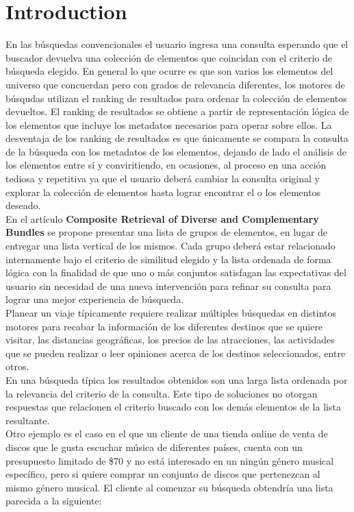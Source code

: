 
\section{Introduction}
En las búsquedas convencionales el usuario ingresa una consulta esperando que el buscador devuelva una colección de elementos que coincidan con el criterio de búsqueda elegido. En general lo que ocurre es que son varios los elementos del universo que concuerdan pero con grados de relevancia diferentes, los motores de búsqudas utilizan el ranking de resultados para ordenar la colección de elementos devueltos. El ranking de resultados se obtiene a partir de representación lógica de los elementos que incluye los metadatos necesarios para operar sobre ellos. La desventaja de los ranking de resultados es que únicamente se compara la consulta de la búsqueda con los metadatos de los elementos, dejando de lado el análisis de los elementos entre sí y conviritiendo, en ocasiones, al proceso en una acción tediosa y repetitiva ya que el usuario deberá cambiar la consulta original y explorar la colección de elementos hasta lograr encontrar el o los elementos deseado.\\
En el  artículo \textbf{Composite Retrieval of Diverse and Complementary Bundles}\cite{compositeRetrival} se propone presentar una lista de grupos de elementos, en lugar de entregar una lista vertical de los mismos. Cada grupo deberá estar relacionado internamente bajo el criterio de similitud elegido y la lista ordenada de forma lógica con la finalidad de que uno o más conjuntos satisfagan las expectativas del usuario sin necesidad de una nueva intervención para refinar su consulta para lograr una mejor experiencia de búsqueda.\\
Planear un viaje típicamente requiere realizar múltiples búsquedas en distintos motores para recabar la información de los diferentes destinos que se quiere visitar, las distancias geográficas, los precios de las atracciones, las actividades que se pueden realizar o leer opiniones acerca de los destinos seleccionados, entre otros.\\
En una búsqueda típica los resultados obtenidos son una larga lista ordenada por la relevancia del criterio de la consulta. Este tipo de soluciones no otorgan respuestas que relacionen el criterio buscado con los demás elementos de la lista resultante.\\
Otro ejemplo es el caso en el que un cliente de una tienda online de venta de discos que le gusta escuchar música de diferentes países, cuenta con un presupuesto limitado de \$70 y no está interesado en un ningún género musical específico, pero si quiere comprar un conjunto de discos que pertenezcan al mismo género musical. El cliente al comenzar su búsqueda obtendría una lista parecida a la siguiente:
